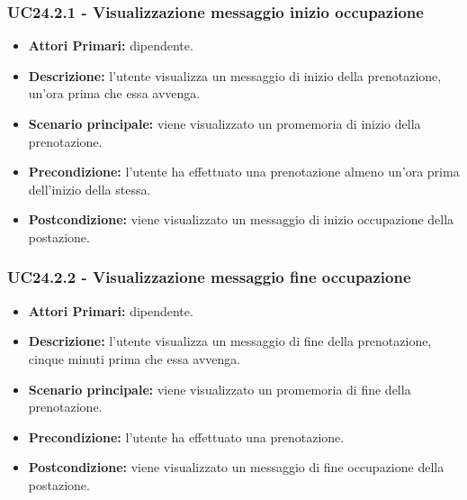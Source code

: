 \subsubsection{ UC24.2.1 - Visualizzazione messaggio inizio occupazione}
\begin{itemize}
	\item\textbf{Attori Primari:} dipendente.
	\item\textbf{Descrizione:} l’utente visualizza un messaggio di inizio della prenotazione, un'ora prima che essa avvenga.
	\item\textbf{Scenario principale:} viene visualizzato un promemoria di inizio della prenotazione.
	\item\textbf{Precondizione:} l’utente ha effettuato una prenotazione almeno un'ora prima dell'inizio della stessa.
	\item\textbf{Postcondizione:} viene visualizzato un messaggio di inizio occupazione della postazione.
\end{itemize}

\subsubsection{ UC24.2.2 - Visualizzazione messaggio fine occupazione}
\begin{itemize}
	\item\textbf{Attori Primari:} dipendente.
	\item\textbf{Descrizione:} l’utente visualizza un messaggio di fine della prenotazione, cinque minuti prima che essa avvenga.
	\item\textbf{Scenario principale:} viene visualizzato un promemoria di fine della prenotazione.
	\item\textbf{Precondizione:} l’utente ha effettuato una prenotazione.
	\item\textbf{Postcondizione:} viene visualizzato un messaggio di fine occupazione della postazione.
\end{itemize}

